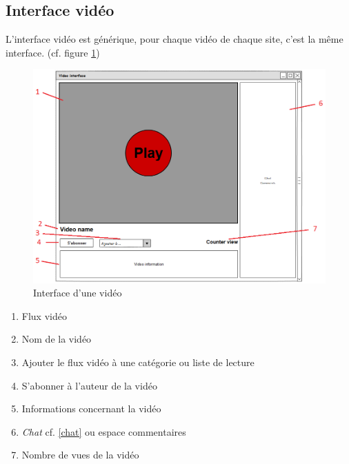 \documentclass[11pt]{report} %
\begin{document}
		\newpage

		\subsection{Interface vidéo}
		L'interface vidéo est générique, pour chaque vidéo de chaque site, c'est la même interface. (cf. figure \ref{interfacevideo})
		\begin{figure}[h]
			\center
			\includegraphics[width=1\textwidth]{../img/videoInterfacenum.png}
			\caption{Interface d'une vidéo}
			\label{interfacevideo}
		\end{figure}
		
		\begin{enumerate}
			\item Flux vidéo
			\item Nom de la vidéo
			\item Ajouter le flux vidéo à une catégorie ou liste de lecture
			\item S'abonner à l'auteur de la vidéo
			\item Informations concernant la vidéo
			\item \textit{Chat} cf. \ref{chat} ou espace commentaires
			\item Nombre de vues de la vidéo
		\end{enumerate}
		
		\newpage
		
\end{document}
